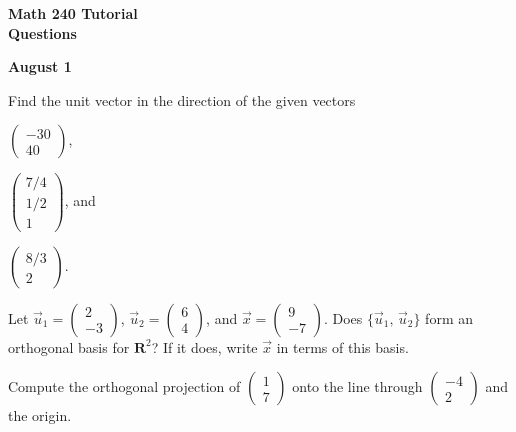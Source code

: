 \documentclass[a4paper,11pt]{article}
\newcommand{\R}{\mathbf{R}}
\begin{document}
\begin{center}
  {\Large\bfseries Math 240 Tutorial \\ Questions}
\end{center}
\begin{center}
  {\bfseries August 1}
\end{center}

 Find the unit vector in the direction of the given
vectors
\begin{enumerate*}[(a)]
\item $\left( \begin{smallmatrix}-30\\40\end{smallmatrix} \right)$,
\item $\left( \begin{smallmatrix}7/4\\1/2\\1\end{smallmatrix} \right)$, and
\item $\left( \begin{smallmatrix}8/3\\2\end{smallmatrix} \right)$. \\
\end{enumerate*}

\begin{enumerate*}[(a)]
\item Let $\vec u_1=\left( \begin{smallmatrix}2\\-3\end{smallmatrix} \right)$,
  $\vec u_2=\left( \begin{smallmatrix}6\\4\end{smallmatrix} \right)$, and $\vec
  x=\left( \begin{smallmatrix}9\\-7\end{smallmatrix} \right)$. Does $\{\vec
  u_1,\,\vec u_2\}$ form an orthogonal basis for $\R^2$? If it does, write $\vec
  x$ in terms of this basis.
\item Compute the orthogonal projection of
  $\left( \begin{smallmatrix}1\\7\end{smallmatrix} \right)$ onto the line
  through $\left( \begin{smallmatrix}-4\\2\end{smallmatrix} \right)$ and the
  origin. \\
\end{enumerate*}
\end{document}
